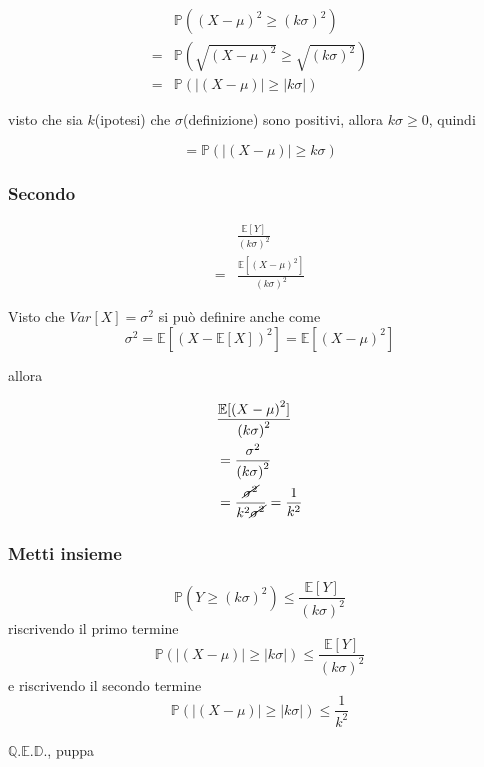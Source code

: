 \documentclass[11pt]{article}
\begin{document}
\begin{align*}
& \mathbb{P}({(X - \mu)}^2 \geq {(k\sigma)}^2) \\
= &\mathbb{P}(\sqrt{{(X - \mu)}^2} \geq \sqrt{{(k\sigma)}^2}) \\
= &\mathbb{P}(\lvert (X - \mu) \rvert \geq \lvert k\sigma \rvert)
\end{align*}

visto che sia \(k\)(ipotesi) che \(\sigma\)(definizione) sono positivi, allora \(k\sigma \geq 0\),
quindi

\[ = \mathbb{P}(\lvert (X - \mu) \rvert \geq k\sigma) \]

\subsubsection{Secondo}
\label{sec:org2e9ed62}
\begin{align*}
&\frac{\mathbb{E}[Y]}{{(k\sigma)}^2} \\
= &\frac{\mathbb{E}[{(X - \mu)}^2]}{{(k\sigma)}^2}
\end{align*}

Visto che \(Var[X] = \sigma^2\) si può definire anche come
\[\sigma^2 = \mathbb{E}[{(X - \mathbb{E}[X])}^2] = \mathbb{E}[{(X - \mu)}^2] \]

allora

\begin{align*}
& \frac{\mathbb{E}[{(X - \mu)}^2]}{{(k\sigma)}^2} \\
&= \frac{\sigma^2}{{(k\sigma)}^2} \\
&= \frac{\cancel{\sigma^2}}{k^2 \cancel{\sigma^2}} = \frac{1}{k^2}
\end{align*}

\subsubsection{Metti insieme}
\label{sec:orgaa8040a}

\[ \mathbb{P}(Y \geq {(k\sigma)}^2) \leq \frac{\mathbb{E}[Y]}{{(k\sigma)}^2} \]
riscrivendo il primo termine
\[ \mathbb{P}(\lvert (X - \mu) \rvert \geq \lvert k\sigma \rvert)
\leq \frac{\mathbb{E}[Y]}{{(k\sigma)}^2} \]
e riscrivendo il secondo termine
\[ \mathbb{P}(\lvert (X - \mu) \rvert \geq \lvert k\sigma \rvert) \leq \frac{1}{{k^2}} \]

\(\mathbb{Q.E.D.}\), puppa
\end{document}
